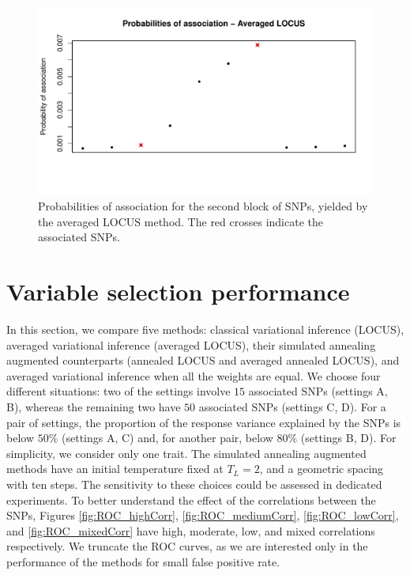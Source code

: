 \documentclass[a4paper, 11pt]{report}
\numberwithin{equation}{chapter}
\begin{document}
\begin{figure}[h!]
\centering
\includegraphics[width=5in, bb=0 0 8in 4.5in]{images/proba_block.pdf}
\caption{\label{fig:probablock}Probabilities of association for the second block of SNPs, yielded by the averaged LOCUS method. The red crosses indicate the associated SNPs.}
\end{figure}

\section{Variable selection performance} \label{sec:varSelPerf}

In this section, we compare five methods: classical variational inference (LOCUS), averaged variational inference (averaged LOCUS), their simulated annealing augmented counterparts (annealed LOCUS and averaged annealed LOCUS), and averaged variational inference when all the weights are equal. We choose four different situations: two of the settings involve $15$ associated SNPs (settings A, B), whereas the remaining two have $50$ associated SNPs (settings C, D). For a pair of settings, the proportion of the response variance explained by the SNPs is below $50\%$ (settings A, C) and, for another pair, below $80\%$ (settings B, D). For simplicity, we consider only one trait. The simulated annealing augmented methods have an initial temperature fixed at $T_L = 2$, and a geometric spacing with ten steps. The sensitivity to these choices could be assessed in dedicated experiments. To better understand the effect of the correlations between the SNPs, Figures \ref{fig:ROC_highCorr}, \ref{fig:ROC_mediumCorr}, \ref{fig:ROC_lowCorr},  and \ref{fig:ROC_mixedCorr} have high, moderate, low, and mixed correlations respectively.  We truncate the ROC curves, as we are interested only in the performance of the methods for small false positive rate.
\end{document}
